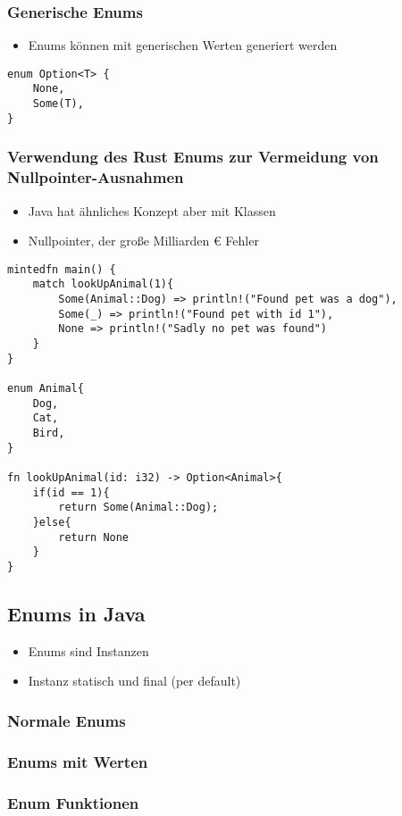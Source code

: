 \documentclass[a4paper, 1ppt]{article}
\begin{document}
\subsubsection{Generische Enums}
\begin{itemize}
	\item Enums können mit generischen Werten generiert werden
\end{itemize}
\begin{verbatim}
enum Option<T> {
	None,
	Some(T),
}
\end{verbatim}
\subsubsection{Verwendung des Rust Enums zur Vermeidung von Nullpointer-Ausnahmen}
\begin{itemize}
	\item Java hat ähnliches Konzept aber mit Klassen
	\item Nullpointer, der große Milliarden € Fehler
\end{itemize}
\begin{verbatim}
mintedfn main() {
    match lookUpAnimal(1){
        Some(Animal::Dog) => println!("Found pet was a dog"),
        Some(_) => println!("Found pet with id 1"),
        None => println!("Sadly no pet was found")
    }
}

enum Animal{
    Dog,
    Cat,
    Bird,
}

fn lookUpAnimal(id: i32) -> Option<Animal>{
    if(id == 1){
        return Some(Animal::Dog);
    }else{
        return None
    }
}
\end{verbatim}
\subsection{Enums in Java}
\begin{itemize}
	\item Enums sind Instanzen
	\item Instanz statisch und final (per default)
\end{itemize}
\subsubsection{Normale Enums}
\subsubsection{Enums mit Werten}
\subsubsection{Enum Funktionen}
\end{document}
